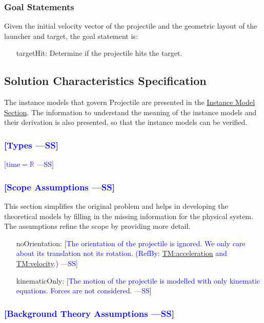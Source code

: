 \documentclass[12pt]{article}
\newcommand{\authornote}[3]{\textcolor{#1}{[#3 ---#2]}}
\newcommand{\authornote}[3]{}
\newcommand{\wss}[1]{\authornote{blue}{SS}{#1}}
\begin{document}
\subsubsection{Goal Statements}
\label{Sec:GoalStmt}
Given the initial velocity vector of the projectile and the geometric layout of the launcher and target, the goal statement is:

\begin{itemize}
\item[targetHit:\phantomsection\label{targetHit}]{Determine if the projectile hits the target.}
\end{itemize}
\subsection{Solution Characteristics Specification}
\label{Sec:SolCharSpec}
The instance models that govern Projectile are presented in the \hyperref[Sec:IMs]{Instance Model Section}. The information to understand the meaning of the instance models and their derivation is also presented, so that the instance models can be verified.

\subsubsection{\wss{Types}}

\wss{$\text{time} = \mathbb{R}$}
\subsubsection{\wss{Scope Assumptions}}
\label{Sec:Assumps}
This section simplifies the original problem and helps in developing the theoretical models by filling in the missing information for the physical system. The assumptions refine the scope by providing more detail.

\begin{itemize}
\item[noOrientation:\phantomsection\label{noOrientation}]{\wss{The orientation of the projectile is ignored. We only care about its translation not its rotation. (RefBy: \hyperref[TM:acceleration]{TM:acceleration} and \hyperref[TM:velocity]{TM:velocity}.)}}
\item[kinematicOnly:\phantomsection\label{kinematicOnly}]{\wss{The motion of the
projectile is modelled with only kinematic equations. Forces are not
considered.}} 
\end{itemize}

\subsubsection{\wss{Background Theory Assumptions}}
\end{document}
